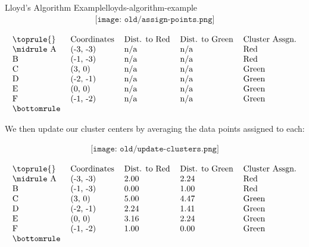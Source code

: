 \begin{example}{Lloyd's Algorithm Example}{lloyds-algorithm-example}
	\begin{align*}
		\texttt{[image: old/assign-points.png]}
	\end{align*}

	\begin{align*}
	\begin{tabular}{lllll}
	\toprule
	{} & Coordinates & Dist. to Red & Dist. to Green & Cluster Assgn. \\
	\midrule
	A &    (-3, -3) &         n/a &            n/a &              Red \\
	B &    (-1, -3) &         n/a &            n/a &              Red \\
	C &      (3, 0) &         n/a &            n/a &            Green \\
	D &    (-2, -1) &         n/a &            n/a &            Green \\
	E &      (0, 0) &         n/a &            n/a &            Green \\
	F &    (-1, -2) &         n/a &            n/a &            Green \\
	\bottomrule
	\end{tabular}
	\end{align*} \newline

	We then update our cluster centers by averaging the data points assigned to each:

	\begin{align*}
		\texttt{[image: old/update-clusters.png]}
	\end{align*}

	\begin{align*}
	\begin{tabular}{lllll}
	\toprule
	{} & Coordinates & Dist. to Red & Dist. to Green & Cluster Assgn. \\
	\midrule
	A &    (-3, -3) &         2.00 &           2.24 &            Red \\
	B &    (-1, -3) &         0.00 &           1.00 &            Red \\
	C &      (3, 0) &         5.00 &           4.47 &          Green \\
	D &    (-2, -1) &         2.24 &           1.41 &          Green \\
	E &      (0, 0) &         3.16 &           2.24 &          Green \\
	F &    (-1, -2) &         1.00 &           0.00 &          Green \\
	\bottomrule
	\end{tabular}
	\end{align*}


\end{example}
